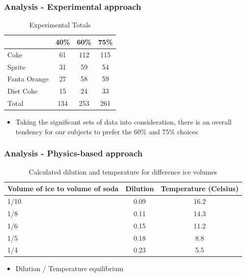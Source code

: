 \documentclass[compress,handout,10pt]{beamer}
\let\olditem\item
\renewcommand{\item}{\setlength{\itemsep}{0.5\baselineskip}\olditem}
\begin{document}
\begin{frame}
    \frametitle{Analysis - Experimental approach}
\begin{table}[ h]
\centering
\begin{tabular}{ l || c|c|c }
  &40\% &60\% & 75\%  \\
\hline  
Coke & 61 & 112 & 115 \\
\hline  
Sprite & 31& 59 & 54 \\
\hline  
Fanta Orange & 27 & 58 & 59 \\ 
\hline  
Diet Coke & 15 & 24& 33 \\ 
\hline  
Total & 134 & 253 & 261  \\ 
\hline     
 \end{tabular}
\caption{Experimental Totals}
\end{table}

\begin{itemize}
\item Taking the significant sets of data into consideration, there is an overall tendency for our subjects to prefer the 60\% and 75\% choices

\end{itemize}

\end{frame}


\begin{frame}
    \frametitle{Analysis - Physics-based approach}
\begin{table}[ h]
\centering
\begin{tabular}{ l || c|c}
 Volume of ice to volume of soda &Dilution &Temperature (Celsius) \\
\hline  
1/10 & 0.09&16.2\\ 
\hline  
1/8 & 0.11&14.3\\ 
\hline 
1/6 & 0.15&11.2\\ 
\hline 
1/5 & 0.18&8.8\\ 
\hline 
1/4 & 0.23&5.5\\ 
\hline    
\end{tabular}
\caption{Calculated dilution and temperature for difference ice volumes}
\end{table}

\begin{itemize}
\item Dilution / Temperature equilibrium 
\end{itemize}

\end{frame}
\end{document}
